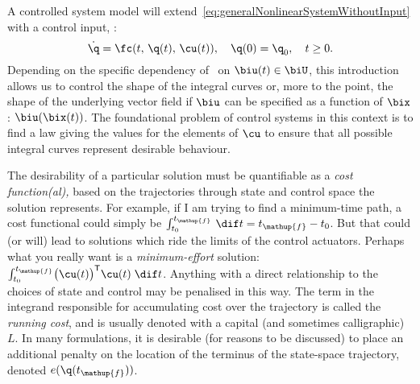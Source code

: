 A controlled system model will
extend~\eqref{eq:generalNonlinearSystemWithoutInput} with a control input, \cu:
%
\begin{equation}\label{eq:generalNonlinearSystem}
  \dot{\q} = \fc(t,\, \q(t),\, \cu(t)),\quad \q(0) = \q_0,\quad t\ge0.
\end{equation}
%
Depending on the specific dependency of \fc\ on $\biu(t)\in \biU$, this
introduction allows us to control the shape of the integral curves or, more to
the point, the shape of the underlying vector field if $\biu$ can be specified
as a function of $\bix$: $\biu(\bix(t))$. The foundational problem of control
systems in this context is to find a law giving the values for the elements of
$\cu$ to ensure that all possible integral curves represent desirable behaviour.

The desirability of a particular solution must be quantifiable as a \emph{cost
function(al),} based on the trajectories through state and control space the
solution represents. For example, if I am trying to find a minimum-time path, a
cost functional could simply be $\int_{t_0}^{t_\mathup{f}}\,\dif t =
t_\mathup{f} - t_0$. But that could (or will) lead to solutions which ride the
limits of the control actuators. Perhaps what you really want is a
\emph{minimum-effort} solution: $\int_{t_0}^{t_\mathup{f}}
\bigl(\cu(t)\bigr)\tr\cu(t)\; \dif t$. Anything with a direct relationship to
the choices of state and control may be penalised in this way. The term in the
integrand responsible for accumulating cost over the trajectory is called the
\emph{running cost}, and is usually denoted with a capital
(and sometimes calligraphic) $L$. In many
formulations, it is desirable (for reasons to be discussed) to place an
additional penalty on the location of the terminus of the state-space
trajectory, denoted $e(\q(t_\mathup{f}))$.

